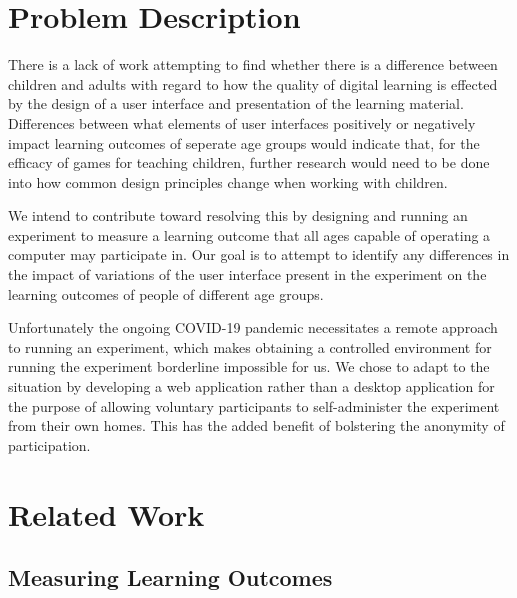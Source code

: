 \documentclass[12pt]{report}
\begin{document}
% 

\chapter{Problem Description}

There is a lack of work attempting to find whether there is a difference between children and adults with regard to how the quality of digital learning is effected by the design of a user interface and presentation of the learning material. Differences between what elements of user interfaces positively or negatively impact learning outcomes of seperate age groups would indicate that, for the efficacy of games for teaching children, further research would need to be done into how common design principles change when working with children.

We intend to contribute toward resolving this by designing and running an experiment to measure a learning outcome that all ages capable of operating a computer may participate in. Our goal is to attempt to identify any differences in the impact of variations of the user interface present in the experiment on the learning outcomes of people of different age groups.

Unfortunately the ongoing COVID-19 pandemic necessitates a remote approach to running an experiment, which makes obtaining a controlled environment for running the experiment borderline impossible for us. We chose to adapt to the situation by developing a web application rather than a desktop application for the purpose of allowing voluntary participants to self-administer the experiment from their own homes. This has the added benefit of bolstering the anonymity of participation.

\chapter{Related Work}


\section{Measuring Learning Outcomes}
\end{document}
